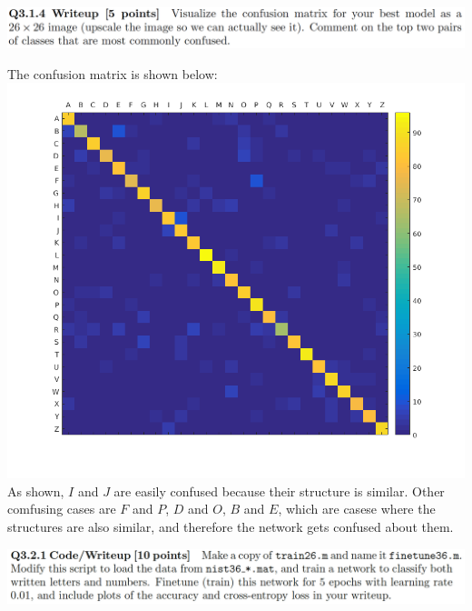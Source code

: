 \documentclass[12pt,letterpaper,boxed]{hmcpset}
\begin{document}
\begin{problem}[]
\includegraphics[width=\textwidth]{3_1_4.png}
\end{problem}

\begin{solution}
The confusion matrix is shown below:\\
\includegraphics[width=\textwidth]{3_1_4_1.png}\\
As shown, $I$ and $J$ are easily confused because their structure is similar. Other comfusing cases are $F$ and $P$,
$D$ and $O$, $B$ and $E$, which are casese where the structures are also similar, and therefore the network gets 
confused about them.
\end{solution}
\newpage

\begin{problem}[]
\includegraphics[width=\textwidth]{3_2_1.png}
\end{problem}
\end{document}
